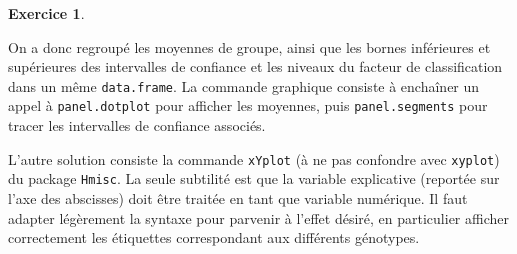 \documentclass[11pt]{report}
\theoremstyle{definition}
\newtheorem{exo}{Exercice}[chapter]
\begin{document}
\begin{exo}
\begin{sol}
On a donc regroupé les moyennes de groupe, ainsi que les bornes inférieures
et supérieures des intervalles de confiance et les niveaux du facteur de
classification dans un même \texttt{data.frame}. La commande graphique
consiste à enchaîner un appel à \texttt{panel.dotplot} pour afficher les
moyennes, puis \texttt{panel.segments} pour tracer les intervalles de
confiance associés.

L'autre solution consiste la commande \texttt{xYplot} (à ne pas confondre
avec \texttt{xyplot}) du package \texttt{Hmisc}. La seule subtilité est que
la variable explicative (reportée sur l'axe des abscisses) doit être traitée
en tant que variable numérique. Il faut adapter légèrement la syntaxe pour
parvenir à l'effet désiré, en particulier afficher correctement les
étiquettes correspondant aux différents génotypes.
\begin{Schunk}
\end{Schunk}
\end{sol}
\end{exo}
%
%
\end{document}
